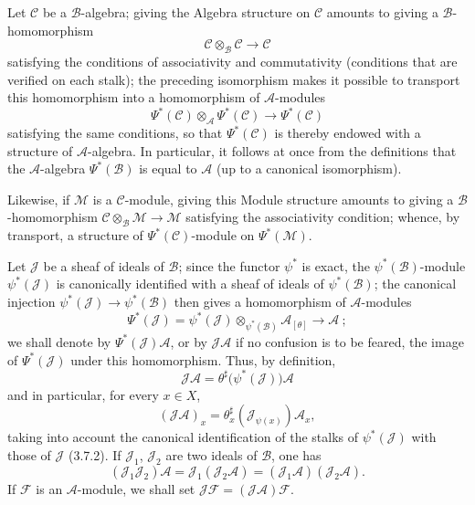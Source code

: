 \begin{env}[4.3.4]
\label{0.4.3.4}
Let $\mathcal{C}$ be a $\mathcal{B}$-algebra; giving the Algebra
structure on $\mathcal{C}$ amounts to giving a $\mathcal{B}$-homomorphism
\[
  \mathcal{C}\otimes_{\mathcal{B}}\mathcal{C}\longrightarrow\mathcal{C}
\]
satisfying the conditions of associativity and commutativity (conditions
that are verified on each stalk); the preceding isomorphism makes it possible to
transport this homomorphism into a homomorphism of $\mathcal{A}$-modules
\[
  \Psi^*(\mathcal{C})\otimes_{\mathcal{A}}\Psi^*(\mathcal{C})
  \longrightarrow\Psi^*(\mathcal{C})
\]
satisfying the same conditions, so that $\Psi^*(\mathcal{C})$ is thereby endowed
with a structure of $\mathcal{A}$-algebra. In particular, it follows at once
from the definitions that the $\mathcal{A}$-algebra $\Psi^*(\mathcal{B})$ is equal to
$\mathcal{A}$ (up to a canonical isomorphism).

Likewise, if $\mathcal{M}$ is a $\mathcal{C}$-module, giving this
Module structure amounts
to giving a $\mathcal{B}$-homomorphism
$\mathcal{C}\otimes_{\mathcal{B}}\mathcal{M}\to\mathcal{M}$ satisfying the
associativity condition; whence, by transport, a structure of
$\Psi^*(\mathcal{C})$-module on $\Psi^*(\mathcal{M})$.
\end{env}

\begin{env}[4.3.5]
\label{0.4.3.5}
Let $\mathcal{J}$ be a sheaf of ideals of $\mathcal{B}$; since the functor
$\psi^*$ is exact, the $\psi^*(\mathcal{B})$-module $\psi^*(\mathcal{J})$
is canonically identified with a sheaf of ideals of $\psi^*(\mathcal{B})$;
the canonical injection $\psi^*(\mathcal{J})\to\psi^*(\mathcal{B})$ then gives
a homomorphism of $\mathcal{A}$-modules
\[
  \Psi^*(\mathcal{J})
  =\psi^*(\mathcal{J})\otimes_{\psi^*(\mathcal{B})}\mathcal{A}_{[\theta]}
  \longrightarrow\mathcal{A}~;
\]
we shall denote by $\Psi^*(\mathcal{J})\mathcal{A}$, or by
$\mathcal{J}\mathcal{A}$ if no confusion is to be feared, the image of
$\Psi^*(\mathcal{J})$ under this homomorphism. Thus, by definition,
\[
  \mathcal{J}\mathcal{A}
  =\theta^\sharp\bigl(\psi^*(\mathcal{J})\bigr)\mathcal{A}
\]
and in particular, for every $x\in X$,
\[
  (\mathcal{J}\mathcal{A})_x
  =\theta_x^\sharp(\mathcal{J}_{\psi(x)})\mathcal{A}_x,
\]
taking into account the canonical identification of the stalks of
$\psi^*(\mathcal{J})$ with those of $\mathcal{J}$ (3.7.2). If
$\mathcal{J}_1$, $\mathcal{J}_2$ are two ideals of $\mathcal{B}$, one has
\[
  (\mathcal{J}_1\mathcal{J}_2)\mathcal{A}
  =\mathcal{J}_1(\mathcal{J}_2\mathcal{A})
  =(\mathcal{J}_1\mathcal{A})(\mathcal{J}_2\mathcal{A}).
\]
If $\mathcal{F}$ is an $\mathcal{A}$-module, we shall set
$\mathcal{J}\mathcal{F}=(\mathcal{J}\mathcal{A})\mathcal{F}$.
\end{env}

